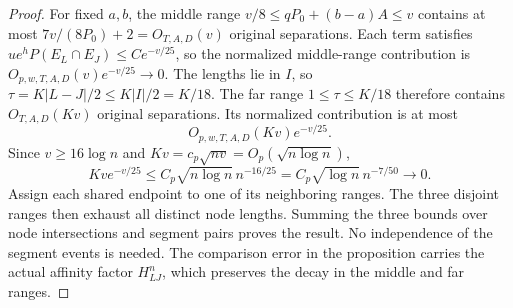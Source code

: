\documentclass[a4paper,11pt]{article}
\theoremstyle{remark}
\begin{document}
\begin{proof}
For fixed \(a,b\), the middle range \(v/8\le qP_0+(b-a)A\le v\) contains
at most \(7v/(8P_0)+2=O_{T,A,D}(v)\) original separations.
Each term satisfies \(ue^hP(E_L\cap E_J)\le Ce^{-v/25}\), so the normalized
middle-range contribution is \(O_{p,w,T,A,D}(v)e^{-v/25}\to0\).
The lengths lie in \(I\), so \(\tau=K|L-J|/2\le K|I|/2=K/18\).
The far range \(1\le\tau\le K/18\) therefore contains
\(O_{T,A,D}(Kv)\) original separations. Its normalized contribution is at most
\[
 O_{p,w,T,A,D}(Kv)e^{-v/25}.
\]
Since \(v\ge16\log n\) and \(Kv=c_p\sqrt{nv}=O_p(\sqrt{n\log n})\),
\[
 Kv e^{-v/25}
 \le C_p\sqrt{n\log n}\,n^{-16/25}
 =C_p\sqrt{\log n}\,n^{-7/50}\longrightarrow0.
\]
Assign each shared endpoint to one of its neighboring ranges. The three
disjoint ranges then exhaust all distinct node lengths. Summing the three
bounds over node intersections and segment pairs proves the result.
No independence of the segment events is needed. The comparison error in the
proposition carries the actual affinity factor \(H_{LJ}^n\), which preserves
the decay in the middle and far ranges.
\end{proof}
\end{document}
